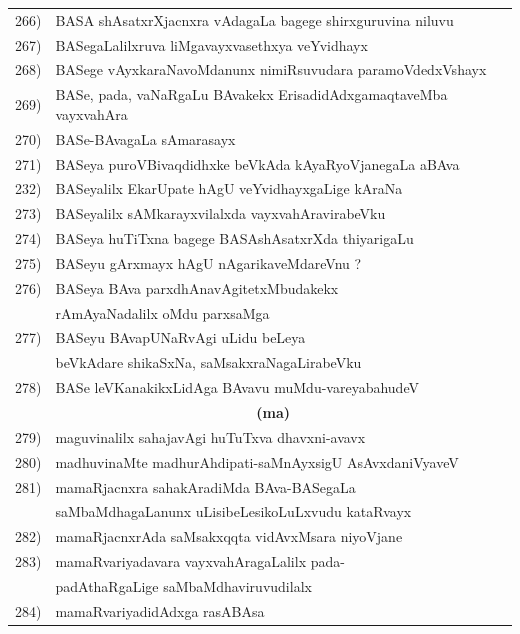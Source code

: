 {\begin{longtable}{@{}cp{7.4cm}r}
266) & BASA shAsatxrXjacnxra vAdagaLa bagege shirxguruvina niluvu & \pageref{page05}\\
267) & BASegaLalilxruva liMgavayxvasethxya veYvidhayx & \pageref{page17}\\
268) & BASege vAyxkaraNavoMdanunx nimiRsuvudara paramoVdedxVshayx & \pageref{page34}\\
269) & BASe, pada, vaNaRgaLu BAvakekx ErisadidAdxgamaqtaveMba vayxvahAra & \pageref{page185}\\
270) & BASe-BAvagaLa sAmarasayx & \pageref{page24}\\
271) & BASeya puroVBivaqdidhxke beVkAda kAyaRyoVjanegaLa aBAva & \pageref{page31}\\
232) & BASeyalilx EkarUpate hAgU veYvidhayxgaLige kAraNa & \pageref{page11}\\
273) & BASeyalilx sAMkarayxvilalxda vayxvahAravirabeVku & \pageref{page174}\\  
274) & BASeya huTiTxna bagege BASAshAsatxrXda thiyarigaLu & \pageref{page3}\\
275) & BASeyu gArxmayx hAgU nAgarikaveMdareVnu ? & \pageref{page11}\\
276) & BASeya BAva parxdhAnavAgitetxMbudakekx & \\
     & rAmAyaNadalilx oMdu parxsaMga & \pageref{page13}\\
277) & BASeyu BAvapUNaRvAgi uLidu beLeya  & \\
     & beVkAdare shikaSxNa, saMsakxraNagaLirabeVku & \pageref{page16}\\
278) & BASe leVKanakikxLidAga BAvavu muMdu-vareyabahudeV & \pageref{page186}\\[0.3cm]
     &  \multicolumn{1}{c}{\textbf{(ma)}} & \\[0.3cm]
279) & maguvinalilx sahajavAgi huTuTxva dhavxni-avavx & \pageref{page6}\\
280) & madhuvinaMte madhurAhdipati-saMnAyxsigU AsAvxdaniVyaveV & \pageref{page283}\\
281) & mamaRjacnxra sahakAradiMda BAva-BASegaLa &  \\
     & saMbaMdhagaLanunx uLisibeLesikoLuLxvudu kataRvayx & \pageref{page18}\\ 
282) & mamaRjacnxrAda saMsakxqqta vidAvxMsara niyoVjane & \pageref{page32}\\
283) & mamaRvariyadavara vayxvahAragaLalilx pada- & \\
     & padAthaRgaLige saMbaMdhaviruvudilalx & \pageref{page205}\\
284) & mamaRvariyadidAdxga rasABAsa & \pageref{page229}\\

\end{longtable}}

